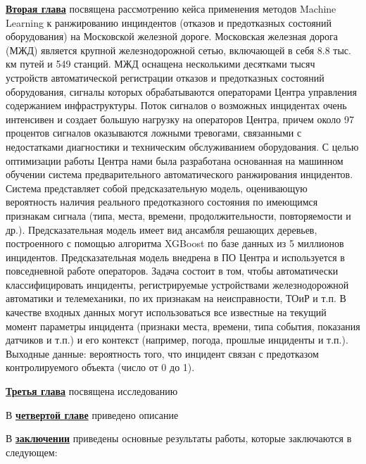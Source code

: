
\underline{\textbf{Вторая глава}} посвящена рассмотрению кейса применения методов Machine Learning к ранжированию инциндентов (отказов и предотказных состояний оборудования) на Московской железной дороге.
Московская железная дорога (МЖД) является крупной железнодорожной сетью, включающей в себя 8.8 тыс. км путей и 549 станций. МЖД оснащена несколькими десятками тысяч устройств автоматической регистрации отказов и предотказных состояний оборудования, сигналы которых обрабатываются операторами Центра управления содержанием инфраструктуры. Поток сигналов о возможных инцидентах очень интенсивен и создает большую нагрузку на операторов Центра, причем около 97 процентов сигналов оказываются ложными тревогами, связанными с недостатками диагностики и техническим обслуживанием оборудования. С целью оптимизации работы Центра нами была разработана основанная на машинном обучении система предварительного автоматического ранжирования инцидентов. Система представляет собой предсказательную модель, оценивающую вероятность наличия реального предотказного состояния по имеющимся признакам сигнала (типа, места, времени, продолжительности, повторяемости и др.). Предсказательная модель имеет вид ансамбля решающих деревьев, построенного с помощью алгоритма XGBoost по базе данных из 5 миллионов инцидентов. Предсказательная модель внедрена в ПО Центра и используется в повседневной работе операторов.
Задача состоит в том, чтобы автоматически классифицировать инциденты, регистрируемые устройствами железнодорожной автоматики и телемеханики, по их признакам на неисправности, ТОиР и т.п. В качестве входных данных могут использоваться все известные на текущий момент параметры инцидента (признаки места, времени, типа события, показания датчиков и т.п.) и его контекст (например, погода, прошлые инциденты и т.п.). Выходные данные: вероятность того, что инцидент связан с предотказом контролируемого объекта (число от 0 до 1).

\underline{\textbf{Третья глава}} посвящена исследованию

В \underline{\textbf{четвертой главе}} приведено описание

В \underline{\textbf{заключении}} приведены основные результаты работы, которые заключаются в следующем:




